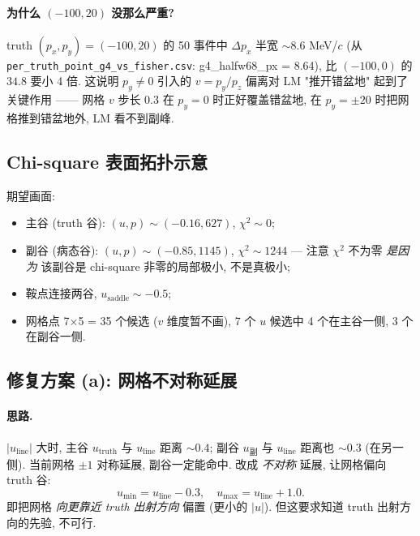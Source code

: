 \paragraph{为什么 $(-100, 20)$ 没那么严重?}
truth $(p_x, p_y) = (-100, 20)$ 的 50 事件中 $\Delta p_x$ 半宽 $\sim 8.6$ MeV/$c$ (从 \texttt{per\_truth\_point\_g4\_vs\_fisher.csv}: g4\_halfw68\_px = 8.64), 比 $(-100, 0)$ 的 $34.8$ 要小 4 倍. 这说明 $p_y \ne 0$ 引入的 $v = p_y / p_z$ 偏离对 LM "推开错盆地" 起到了关键作用 —— 网格 $v$ 步长 0.3 在 $p_y = 0$ 时正好覆盖错盆地, 在 $p_y = \pm 20$ 时把网格推到错盆地外, LM 看不到副峰.

\subsection{Chi-square 表面拓扑示意}
\label{sec:partIII:basin:chi2_topology}


期望画面:
\begin{itemize}[nosep]
  \item 主谷 (truth 谷): $(u, p) \sim (-0.16, 627)$, $\chi^2 \sim 0$;
  \item 副谷 (病态谷): $(u, p) \sim (-0.85, 1145)$, $\chi^2 \sim 1244$ — 注意 $\chi^2$ 不为零 \emph{是因为} 该副谷是 chi-square 非零的局部极小, 不是真极小;
  \item 鞍点连接两谷, $u_{\mathrm{saddle}} \sim -0.5$;
  \item 网格点 7$\times$5 = 35 个候选 ($v$ 维度暂不画), 7 个 $u$ 候选中 4 个在主谷一侧, 3 个在副谷一侧.
\end{itemize}

\subsection{修复方案 (a): 网格不对称延展}
\label{sec:partIII:basin:fix_a}

\paragraph{思路.}
$|u_{\mathrm{line}}|$ 大时, 主谷 $u_{\mathrm{truth}}$ 与 $u_{\mathrm{line}}$ 距离 $\sim 0.4$; 副谷 $u_{\mathrm{副}}$ 与 $u_{\mathrm{line}}$ 距离也 $\sim 0.3$ (在另一侧). 当前网格 $\pm 1$ 对称延展, 副谷一定能命中. 改成 \emph{不对称} 延展, 让网格偏向 truth 谷:
\[
  u_{\min} = u_{\mathrm{line}} - 0.3, \quad u_{\max} = u_{\mathrm{line}} + 1.0.
\]
即把网格 \emph{向更靠近 truth 出射方向} 偏置 (更小的 $|u|$). 但这要求知道 truth 出射方向的先验, 不可行.

